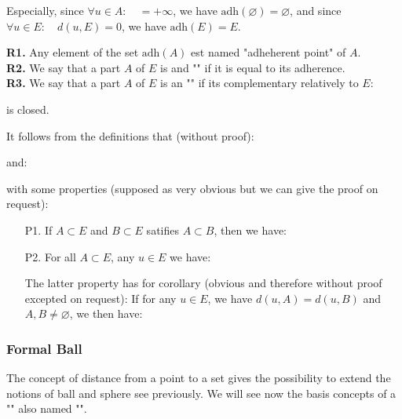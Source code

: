\begin{enumerate}
		Especially, since $\forall u\in A:\quad =+\infty$, we have $\text{adh}(\varnothing)=\varnothing$, and since $\forall u\in E:\quad d(u,E)=0$, we have $\text{adh}(E)=E$.
		
		\begin{tcolorbox}[title=Remarks,colframe=black,arc=10pt]
		\textbf{R1.} Any element of the set $\text{adh}(A)$ est named "adheherent point" of $A$.\\
		
		\textbf{R2.} We say that a part $A$ of $E$ is and "" if it is equal to its adherence.\\
		
		\textbf{R3.} We say that a part $A$ of $E$ is an "" if its complementary relatively to $E$:
		
		is closed.
		\end{tcolorbox}	
	\end{enumerate}
	It follows from the definitions that (without proof):
	
	and:
	
	with some properties (supposed as very obvious but we can give the proof on request):
	\begin{enumerate}
		\item[P1.] If $A\subset E$ and $B\subset E$ satifies $A\subset B$, then we have:
		
		
		\item[P2.] For all $A\subset E$, any $u\in E$ we have:
		
		The latter property has for corollary (obvious and therefore without proof excepted on request):
		If for any $u\in E$, we have $d(u,A)=d(u,B)$ and $A,B\neq \varnothing$, we then have:
		
	\end{enumerate}
	
	\subsubsection{Formal Ball}
	The concept of distance from a point to a set gives the possibility to extend the notions of ball and sphere see previously. We will see now the basis concepts of a "" also named "".
	
